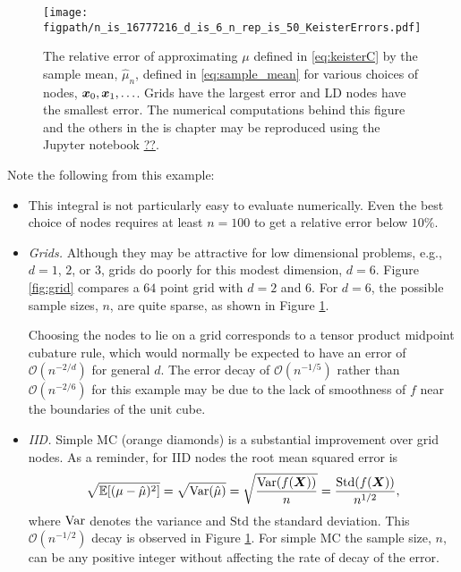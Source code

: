 \documentclass{svproc}
\newcommand{\figpath}{Figures}
\begin{document}
\begin{figure}
	\centering
	\texttt{[image: \\figpath/n\_is\_16777216\_d\_is\_6\_n\_rep\_is\_50\_KeisterErrors.pdf]}
	\caption{The relative error of approximating $\mu$ defined in \eqref{eq:keisterC} by the sample mean, $\hat{\mu}_n$, defined in \eqref{eq:sample_mean} for various choices of nodes, ${\boldsymbol{x}}_0, {\boldsymbol{x}}_1, \ldots$.  Grids have the largest error and LD nodes have the smallest error. The numerical computations behind this figure and the others in the is chapter may be reproduced using the Jupyter notebook \url{??}. \label{fig:keister-err}}
\end{figure}

Note the following from this example:
\begin{itemize}
	\item This integral is not particularly easy to evaluate numerically.  Even the best choice of nodes requires at least $n=100$ to get a relative error below $10\%$.

	\item \emph{Grids.} Although they may be attractive for low dimensional problems, e.g., $d = 1$, $2$, or $3$, grids do poorly for this modest dimension, $d=6$.  Figure \ref{fig:grid} compares a $64$ point grid with $d = 2$ and $6$.  For $d = 6$, the possible sample sizes, $n$, are quite sparse, as shown in Figure \ref{fig:keister-err}.

	Choosing the nodes to lie on a grid corresponds to a tensor product midpoint cubature rule, which would normally be expected to have an error of $\mathcal{O}(n^{-2/d})$  for general $d$.  The error decay of $\mathcal{O}(n^{-1/5})$ rather than $\mathcal{O}(n^{-2/6})$ for this example may be due to the lack of smoothness of $f$ near the boundaries of the unit cube.

	\item \emph{IID.}  Simple MC (orange diamonds) is a substantial improvement over grid nodes. As a reminder, for IID nodes the root mean squared error is
	\begin{equation}\label{eq:IIDerror}
		\sqrt{\mathbb{E}[(\mu - \hat{\mu})^2]} = \sqrt{\operatorname{Var}(\hat{\mu})} = \sqrt{\frac{\operatorname{Var}(f({\boldsymbol{X}}))}{n}} = \frac{\mathrm{Std}(f({\boldsymbol{X}}))}{n^{1/2}},
	\end{equation}
	where $\operatorname{Var}$ denotes the variance and $\mathrm{Std}$ the standard deviation.  This $\mathcal{O}(n^{-1/2})$ decay is observed in Figure \ref{fig:keister-err}. For simple MC the sample size, $n$, can be any positive integer without affecting the rate of decay of the error.


\end{itemize}
\end{document}

